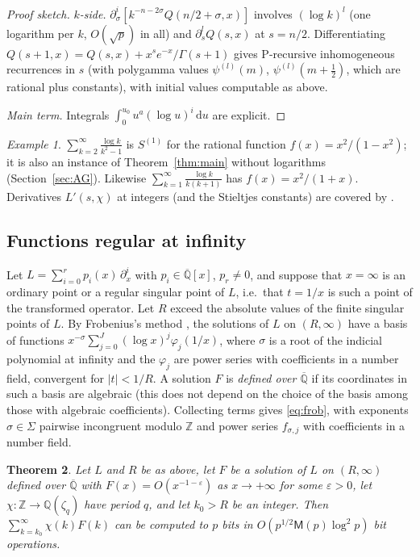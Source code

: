 \documentclass[11pt]{amsart}
\newtheorem{theorem}{Theorem}[section]
\theoremstyle{definition}
\theoremstyle{remark}
\newtheorem{example}[theorem]{Example}
\newcommand{\dd}{\,\mathrm{d}}
\newcommand{\QQ}{\mathbb{Q}}
\newcommand{\Qbar}{\overline{\mathbb{Q}}}
\newcommand{\ZZ}{\mathbb{Z}}
\newcommand{\Mul}{\mathsf{M}}
\begin{document}
\begin{proof}[Proof sketch]
\emph{$k$-side.} $\partial_\sigma^i[k^{-n-2\sigma}Q(n/2+\sigma, x)]$ involves $(\log k)^l$ (one logarithm per $k$, $O(\sqrt p)$ in all) and
$\partial_s^l Q(s, x)$ at $s = n/2$. Differentiating $Q(s+1, x) = Q(s, x) + x^se^{-x}/\Gamma(s+1)$ gives
P-recursive inhomogeneous recurrences in $s$ (with polygamma values $\psi^{(l)}(m)$, $\psi^{(l)}(m+\frac12)$, which
are rational plus constants), with initial values computable as above.

\emph{Main term.} Integrals $\int_0^{u_0}u^{a}(\log u)^i\dd u$ are explicit.
\end{proof}

\begin{example}
$\sum_{k=2}^{\infty}\frac{\log k}{k^2-1}$ is $S^{(1)}$ for the rational function $f(x) = x^2/(1-x^2)$; it is also an
instance of Theorem~\ref{thm:main} without logarithms (Section~\ref{sec:AG}). Likewise
$\sum_{k=1}^{\infty} \frac{\log k}{k(k+1)}$ has $f(x) = x^2/(1+x)$. Derivatives $L'(s,\chi)$ at integers
(and the Stieltjes constants) are covered by \cite{Joh21}.
\end{example}

\subsection{Functions regular at infinity}\label{sec:regular}

Let $L = \sum_{i=0}^r p_i(x)\,\partial_x^i$ with $p_i \in \Qbar[x]$, $p_r \ne 0$, and suppose that $x = \infty$ is an
ordinary point or a regular singular point of $L$, i.e.\ that $t = 1/x$ is such a point of the transformed
operator. Let $R$ exceed the absolute values of the finite singular points of $L$. By Frobenius's method
\cite[\S16]{Inc26}, the solutions of $L$ on $(R, \infty)$ have a basis of functions
$x^{-\sigma}\sum_{j=0}^{J}(\log x)^j\varphi_j(1/x)$, where $\sigma$ is a root of the indicial polynomial at infinity and
the $\varphi_j$ are power series with coefficients in a number field, convergent for $|t| < 1/R$. A solution $F$ is
\emph{defined over $\Qbar$} if its coordinates in such a basis are algebraic (this does not depend on the choice
of the basis among those with algebraic coefficients). Collecting terms gives \eqref{eq:frob}, with exponents
$\sigma \in \Sigma$ pairwise incongruent modulo $\ZZ$ and power series $f_{\sigma,j}$ with coefficients in a number field.

\begin{theorem}\label{thm:general}
Let $L$ and $R$ be as above, let $F$ be a solution of $L$ on $(R,\infty)$ defined over $\Qbar$ with
$F(x) = O(x^{-1-\varepsilon})$ as $x \to +\infty$ for some $\varepsilon > 0$, let $\chi \colon \ZZ \to \QQ(\zeta_q)$
have period $q$, and let $k_0 > R$ be an integer. Then $\sum_{k=k_0}^{\infty}\chi(k)F(k)$ can be computed to $p$ bits
in $O(p^{1/2}\Mul(p)\log^2 p)$ bit operations.
\end{theorem}
\end{document}
